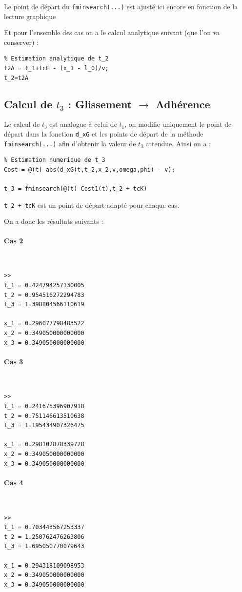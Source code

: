 \documentclass{article}
\begin{document}
Le point de départ du \verb|fminsearch(...)| est ajusté ici encore en fonction de la lecture graphique 

Et pour l'ensemble des cas on a le calcul analytique suivant (que l'on va conserver) :

\begin{lstlisting}
% Estimation analytique de t_2
t2A = t_1+tcF - (x_1 - l_0)/v;
t_2=t2A
\end{lstlisting}

\subsection{Calcul de $t_3$ : Glissement $\rightarrow$ Adhérence}
Le calcul de $t_3$ est analogue à celui de $t_1$, on modifie uniquement le point de départ dans la fonction \verb|d_xG| et les points de départ de la méthode \verb|fminsearch(...)| afin d'obtenir la valeur de $t_3$ attendue. Ainsi on a :

\begin{lstlisting}
% Estimation numerique de t_3
Cost = @(t) abs(d_xG(t,t_2,x_2,v,omega,phi) - v);

t_3 = fminsearch(@(t) Cost1(t),t_2 + tcK)		
\end{lstlisting}

\verb|t_2 + tcK| est un point de départ adapté pour chaque cas. 

On a donc les résultats suivants : 

\paragraph{Cas 2}
$ $
\begin{lstlisting}
>>
t_1 = 0.424794257130005
t_2 = 0.954516272294783
t_3 = 1.398804566110619

x_1 = 0.296077798483522
x_2 = 0.349050000000000
x_3 = 0.349050000000000
\end{lstlisting}
\paragraph{Cas 3}
$ $
\begin{lstlisting}
>>
t_1 = 0.241675396907918
t_2 = 0.751146613510638
t_3 = 1.195434907326475

x_1 = 0.298102878339728
x_2 = 0.349050000000000
x_3 = 0.349050000000000
\end{lstlisting}

\paragraph{Cas 4}
$ $ 
\begin{lstlisting}
>>
t_1 = 0.703443567253337
t_2 = 1.250762476263806
t_3 = 1.695050770079643

x_1 = 0.294318109098953
x_2 = 0.349050000000000
x_3 = 0.349050000000000
\end{lstlisting}
\end{document}
